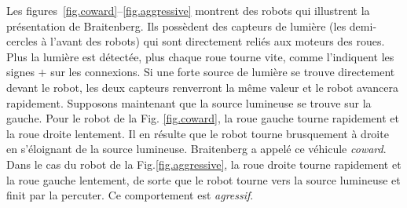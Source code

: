 {Les figures~\ref{fig.coward}--\ref{fig.aggressive} montrent des robots qui illustrent la présentation de Braitenberg. Ils possèdent des capteurs de lumière (les demi-cercles à l'avant des robots) qui sont directement reliés aux moteurs des roues. Plus la lumière est détectée, plus chaque roue tourne vite, comme l'indiquent les signes $+$ sur les connexions. Si une forte source de lumière se trouve directement devant le robot, les deux capteurs renverront la même valeur et le robot avancera rapidement. Supposons maintenant que la source lumineuse se trouve sur la gauche. Pour le robot de la Fig. \ref{fig.coward}, la roue gauche tourne rapidement et la roue droite lentement. Il en résulte que le robot tourne brusquement à droite en s'éloignant de la source lumineuse. Braitenberg a appelé ce véhicule \emph{coward}. Dans le cas du robot de la Fig.\ref{fig.aggressive}, la roue droite tourne rapidement et la roue gauche lentement, de sorte que le robot tourne vers la source lumineuse et finit par la percuter. Ce comportement est \emph{agressif}.

}

